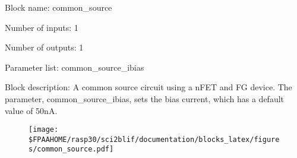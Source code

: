 \pagebreak

Block name: common\_source

Number of inputs: 1

Number of outputs: 1

Parameter list: common\_source\_ibias

Block description: 
A common source circuit using a nFET and FG device. The parameter, common\_source\_ibias, sets the bias current, which has a default value of 50nA.

\begin{figure}[H]  %
\texttt{[image: \$FPAAHOME/rasp30/sci2blif/documentation/blocks\_latex/figures/common\_source.pdf]}
\end{figure}

